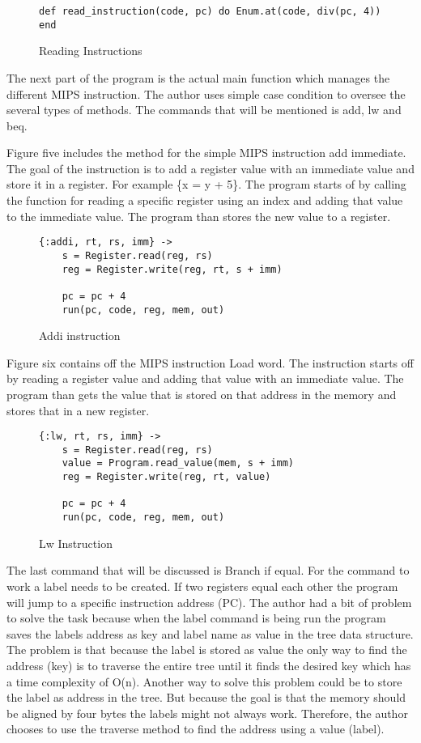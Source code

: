 \documentclass[a4paper,11pt]{article}
\begin{document}
\begin{figure}[H]
\begin{verbatim}
def read_instruction(code, pc) do Enum.at(code, div(pc, 4)) end
\end{verbatim}
\caption{Reading Instructions}
\label{Figure:4}
\end{figure}

The next part of the program is the actual main function which manages the different MIPS instruction. The author uses simple case condition to oversee the several types of methods. The commands that will be mentioned is add, lw and beq.

Figure five includes the method for the simple MIPS instruction add immediate. The goal of the instruction is to add a register value with an immediate value and store it in a register. For example \{x = y + 5\}. The program starts of by calling the function for reading a specific register using an index and adding that value to the immediate value. The program than stores the new value to a register.

\begin{figure}[H]
\begin{verbatim}
{:addi, rt, rs, imm} ->
    s = Register.read(reg, rs)
    reg = Register.write(reg, rt, s + imm)

    pc = pc + 4
    run(pc, code, reg, mem, out)
\end{verbatim}
\caption{Addi instruction}
\label{Figure:5}
\end{figure}

Figure six contains off the MIPS instruction Load word. The instruction starts off by reading a register value and adding that value with an immediate value. The program than gets the value that is stored on that address in the memory and stores that in a new register.

\begin{figure}[H]
\begin{verbatim}
{:lw, rt, rs, imm} ->
    s = Register.read(reg, rs)
    value = Program.read_value(mem, s + imm)
    reg = Register.write(reg, rt, value)

    pc = pc + 4
    run(pc, code, reg, mem, out)
\end{verbatim}
\caption{Lw Instruction}
\label{Figure:6}
\end{figure}


The last command that will be discussed is Branch if equal. For the command to work a label needs to be created. If two registers equal each other the program will jump to a specific instruction address (PC). The author had a bit of problem to solve the task because when the label command is being run the program saves the labels address as key and label name as value in the tree data structure. The problem is that because the label is stored as value the only way to find the address (key) is to traverse the entire tree until it finds the desired key which has a time complexity of O(n). Another way to solve this problem could be to store the label as address in the tree. But because the goal is that the memory should be aligned by four bytes the labels might not always work. Therefore, the author chooses to use the traverse method to find the address using a value (label).
\end{document}
